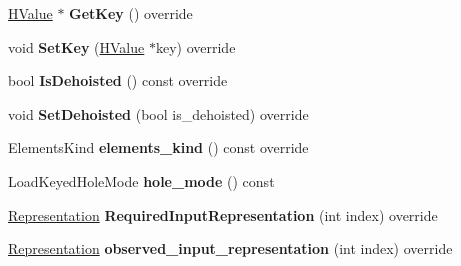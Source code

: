 \begin{DoxyCompactItemize}
\item 
\hyperlink{classv8_1_1internal_1_1_h_value}{H\+Value} $\ast$ {\bfseries Get\+Key} () override\hypertarget{classv8_1_1internal_1_1_h_load_keyed_a6cf88c54a130d80a096c5067be2b60cd}{}\label{classv8_1_1internal_1_1_h_load_keyed_a6cf88c54a130d80a096c5067be2b60cd}

\item 
void {\bfseries Set\+Key} (\hyperlink{classv8_1_1internal_1_1_h_value}{H\+Value} $\ast$key) override\hypertarget{classv8_1_1internal_1_1_h_load_keyed_ac1301b460727d357128a80ca188fc9fa}{}\label{classv8_1_1internal_1_1_h_load_keyed_ac1301b460727d357128a80ca188fc9fa}

\item 
bool {\bfseries Is\+Dehoisted} () const  override\hypertarget{classv8_1_1internal_1_1_h_load_keyed_a2a82a6f75a113b610a98ff33915c0654}{}\label{classv8_1_1internal_1_1_h_load_keyed_a2a82a6f75a113b610a98ff33915c0654}

\item 
void {\bfseries Set\+Dehoisted} (bool is\+\_\+dehoisted) override\hypertarget{classv8_1_1internal_1_1_h_load_keyed_a7468ad35b9f310cebd813892716eb22f}{}\label{classv8_1_1internal_1_1_h_load_keyed_a7468ad35b9f310cebd813892716eb22f}

\item 
Elements\+Kind {\bfseries elements\+\_\+kind} () const  override\hypertarget{classv8_1_1internal_1_1_h_load_keyed_a8a8541bec12cda74af96ced9fb761b56}{}\label{classv8_1_1internal_1_1_h_load_keyed_a8a8541bec12cda74af96ced9fb761b56}

\item 
Load\+Keyed\+Hole\+Mode {\bfseries hole\+\_\+mode} () const \hypertarget{classv8_1_1internal_1_1_h_load_keyed_a8834e6fd196fcf9130cf0f6f43a66a90}{}\label{classv8_1_1internal_1_1_h_load_keyed_a8834e6fd196fcf9130cf0f6f43a66a90}

\item 
\hyperlink{classv8_1_1internal_1_1_representation}{Representation} {\bfseries Required\+Input\+Representation} (int index) override\hypertarget{classv8_1_1internal_1_1_h_load_keyed_a526ed2b03916687895a6f42d067c701f}{}\label{classv8_1_1internal_1_1_h_load_keyed_a526ed2b03916687895a6f42d067c701f}

\item 
\hyperlink{classv8_1_1internal_1_1_representation}{Representation} {\bfseries observed\+\_\+input\+\_\+representation} (int index) override\hypertarget{classv8_1_1internal_1_1_h_load_keyed_a652957aeac3158b4e2cfcb6390511109}{}\label{classv8_1_1internal_1_1_h_load_keyed_a652957aeac3158b4e2cfcb6390511109}


\end{DoxyCompactItemize}
